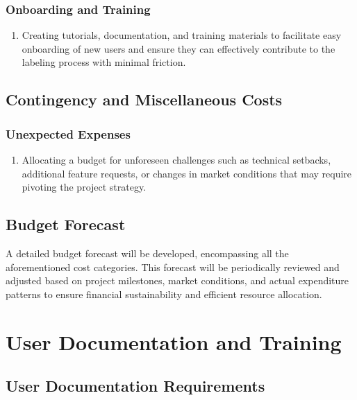 \documentclass[12pt]{article}
\begin{document}
\subsubsection{Onboarding and Training}
\begin{enumerate}
  \item Creating tutorials, documentation, and training materials to facilitate easy onboarding of new users and ensure they can effectively contribute to the labeling process with minimal friction.
  \end{enumerate}

\subsection{Contingency and Miscellaneous Costs}
\subsubsection{Unexpected Expenses}
\begin{enumerate}
  \item Allocating a budget for unforeseen challenges such as technical setbacks, additional feature requests, or changes in market conditions that may require pivoting the project strategy.
  \end{enumerate}

\subsection{Budget Forecast}
A detailed budget forecast will be developed, encompassing all the aforementioned cost categories. This forecast will be periodically reviewed and adjusted based on project milestones, market conditions, and actual expenditure patterns to ensure financial sustainability and efficient resource allocation.



\section{User Documentation and Training}

\subsection{User Documentation Requirements}
\end{document}
